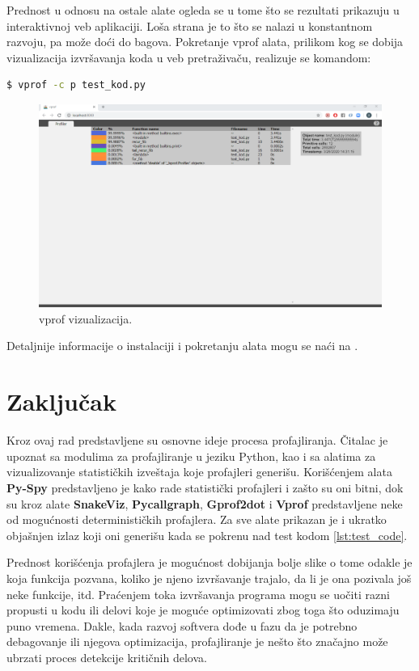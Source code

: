 \documentclass[a4paper]{article}
\begin{document}
Prednost u odnosu na ostale alate ogleda se u tome što se rezultati prikazuju u interaktivnoj veb aplikaciji. Loša strana je to što se nalazi u konstantnom razvoju, pa može doći do bagova. Pokretanje vprof alata, prilikom kog se dobija vizualizacija izvršavanja koda u veb pretraživaču, realizuje se komandom:
\begin{lstlisting}[language=bash, belowskip=-\baselineskip]
  $ vprof -c p test_kod.py
\end{lstlisting}
\begin{figure}[h!]
\begin{center}
\includegraphics[trim={0cm 20cm 0cm 0cm},clip,scale=0.23]{MVJ_02_ProfajleriZaPython_ZecevicSmiljanicMilovanovicPopov/vprof.png}
\end{center}
\caption{vprof vizualizacija.}
\label{fig:vprof_1}
\end{figure}Detaljnije informacije o instalaciji i pokretanju alata mogu se naći na \cite{vprof}.
\section{Zaključak}
\label{sec:zaključak}
Kroz ovaj rad predstavljene su osnovne ideje procesa profajliranja. Čitalac je upoznat sa modulima za profajliranje u jeziku Python, kao i sa alatima za vizualizovanje statističkih izveštaja koje profajleri generišu. Korišćenjem alata \textbf{Py-Spy} predstavljeno je kako rade statistički profajleri i zašto su oni bitni, dok su kroz alate \textbf{SnakeViz}, \textbf{Pycallgraph}, \textbf{Gprof2dot} i \textbf{Vprof} predstavljene neke od mogućnosti determinističkih profajlera. Za sve alate prikazan je i ukratko objašnjen izlaz koji oni generišu kada se pokrenu nad test kodom \ref{lst:test_code}.

Prednost korišćenja profajlera je mogućnost dobijanja bolje slike o tome odakle je koja funkcija pozvana, koliko je njeno izvršavanje trajalo, da li je ona pozivala još neke funkcije, itd. Praćenjem toka izvršavanja programa mogu se uočiti razni propusti u kodu ili delovi koje je moguće optimizovati zbog toga što oduzimaju puno vremena. Dakle, kada razvoj softvera dođe u fazu da je potrebno debagovanje ili njegova optimizacija, profajliranje je nešto što značajno može ubrzati proces detekcije kritičnih delova. 
\end{document}
